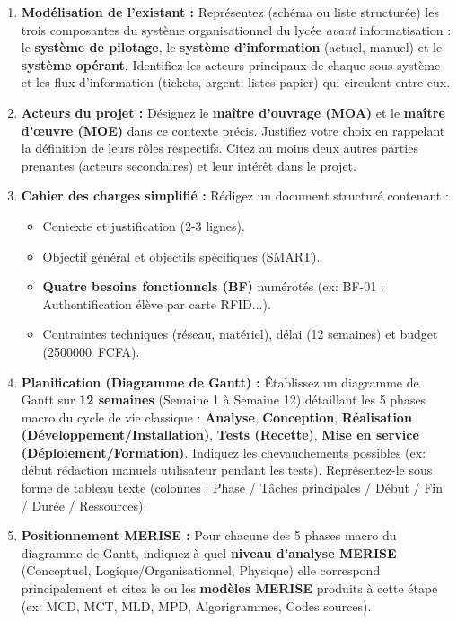 \documentclass[11pt]{article}
\begin{document}
\begin{enumerate}
    \item \textbf{Modélisation de l'existant :} Représentez (schéma ou liste structurée) les trois composantes du système organisationnel du lycée \emph{avant} informatisation : le \textbf{système de pilotage}, le \textbf{système d'information} (actuel, manuel) et le \textbf{système opérant}. Identifiez les acteurs principaux de chaque sous-système et les flux d'information (tickets, argent, listes papier) qui circulent entre eux.
    \item \textbf{Acteurs du projet :} Désignez le \textbf{maître d'ouvrage (MOA)} et le \textbf{maître d'œuvre (MOE)} dans ce contexte précis. Justifiez votre choix en rappelant la définition de leurs rôles respectifs. Citez au moins deux autres parties prenantes (acteurs secondaires) et leur intérêt dans le projet.
    \item \textbf{Cahier des charges simplifié :} Rédigez un document structuré contenant :
    \begin{itemize}
        \item Contexte et justification (2-3 lignes).
        \item Objectif général et objectifs spécifiques (SMART).
        \item \textbf{Quatre besoins fonctionnels (BF)} numérotés (ex: BF-01 : Authentification élève par carte RFID...).
        \item Contraintes techniques (réseau, matériel), délai (12 semaines) et budget (\SI{2500000}{FCFA}).
    \end{itemize}
    \item \textbf{Planification (Diagramme de Gantt) :} Établissez un diagramme de Gantt sur \textbf{12 semaines} (Semaine 1 à Semaine 12) détaillant les 5 phases macro du cycle de vie classique : \textbf{Analyse}, \textbf{Conception}, \textbf{Réalisation (Développement/Installation)}, \textbf{Tests (Recette)}, \textbf{Mise en service (Déploiement/Formation)}. Indiquez les chevauchements possibles (ex: début rédaction manuels utilisateur pendant les tests). Représentez-le sous forme de tableau texte (colonnes : Phase / Tâches principales / Début / Fin / Durée / Ressources).
    \item \textbf{Positionnement MERISE :} Pour chacune des 5 phases macro du diagramme de Gantt, indiquez à quel \textbf{niveau d'analyse MERISE} (Conceptuel, Logique/Organisationnel, Physique) elle correspond principalement et citez le ou les \textbf{modèles MERISE} produits à cette étape (ex: MCD, MCT, MLD, MPD, Algorigrammes, Codes sources).
\end{enumerate}
\end{document}

